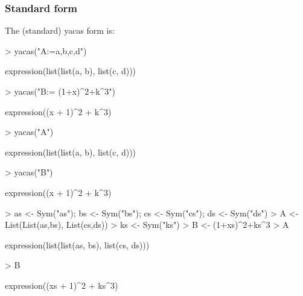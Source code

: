 \documentclass[10pt]{article}
\begin{document}
\subsubsection{Standard form}
The (standard)
yacas form is:
\begin{Schunk}
\begin{Sinput}
> yacas("A:={{a,b},{c,d}}")
\end{Sinput}
\begin{Soutput}
expression(list(list(a, b), list(c, d)))
\end{Soutput}
\begin{Sinput}
> yacas("B:= (1+x)^2+k^3")
\end{Sinput}
\begin{Soutput}
expression((x + 1)^2 + k^3)
\end{Soutput}
\begin{Sinput}
> yacas("A")
\end{Sinput}
\begin{Soutput}
expression(list(list(a, b), list(c, d)))
\end{Soutput}
\begin{Sinput}
> yacas("B")
\end{Sinput}
\begin{Soutput}
expression((x + 1)^2 + k^3)
\end{Soutput}
\end{Schunk}

\begin{Schunk}
\begin{Sinput}
> as <- Sym("as"); bs <- Sym("bs"); cs <- Sym("cs"); ds <- Sym("ds")
> A <- List(List(as,bs), List(cs,ds))
> ks <- Sym("ks")
> B <- (1+xs)^2+ks^3
> A
\end{Sinput}
\begin{Soutput}
expression(list(list(as, bs), list(cs, ds)))
\end{Soutput}
\begin{Sinput}
> B
\end{Sinput}
\begin{Soutput}
expression((xs + 1)^2 + ks^3)
\end{Soutput}
\end{Schunk}
\end{document}

